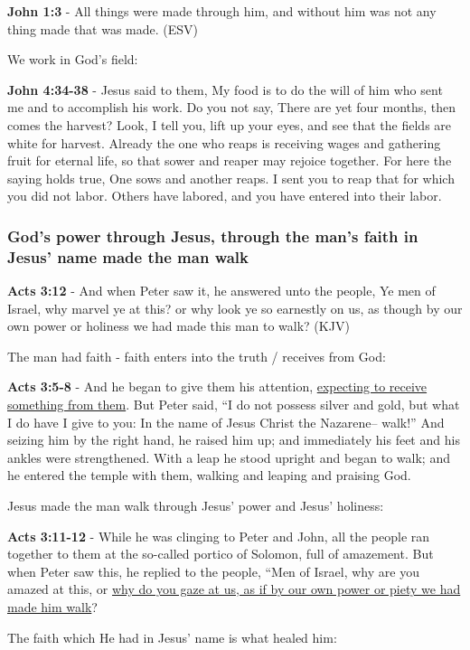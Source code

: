 \documentclass[11pt]{article}
\begin{document}
\textbf{John 1:3} -  All things were made through him, and without him was not any thing made that was made.  (ESV)

We work in God's field:

\textbf{John 4:34-38} - Jesus said to them, My food is to do the will of him who sent me and to accomplish his work. Do you not say, There are yet four months, then comes the harvest? Look, I tell you, lift up your eyes, and see that the fields are white for harvest. Already the one who reaps is receiving wages and gathering fruit for eternal life, so that sower and reaper may rejoice together. For here the saying holds true, One sows and another reaps. I sent you to reap that for which you did not labor. Others have labored, and you have entered into their labor.

\subsubsection{God's power through Jesus, through the man's faith in Jesus' name made the man walk}
\label{sec:org75d594c}
\textbf{Acts 3:12} - And when Peter saw it, he answered unto the people, Ye men of Israel, why marvel ye at this? or why look ye so earnestly on us, as though by our own power or holiness we had made this man to walk? (KJV)

The man had faith - faith enters into the truth / receives from God:

\textbf{Acts 3:5-8} - And he began to give them his attention, \uline{expecting to receive something from them}. But Peter said, “I do not possess silver and gold, but what I do have I give to you: In the name of Jesus Christ the Nazarene-- walk!” And seizing him by the right hand, he raised him up; and immediately his feet and his ankles were strengthened. With a leap he stood upright and began to walk; and he entered the temple with them, walking and leaping and praising God.

Jesus made the man walk through Jesus' power and Jesus' holiness:

\textbf{Acts 3:11-12} - While he was clinging to Peter and John, all the people ran together to them at the so-called portico of Solomon, full of amazement. But when Peter saw this, he replied to the people, “Men of Israel, why are you amazed at this, or \uline{why do you gaze at us, as if by our own power or piety we had made him walk}?

The faith which He had in Jesus' name is what healed him:
\end{document}

